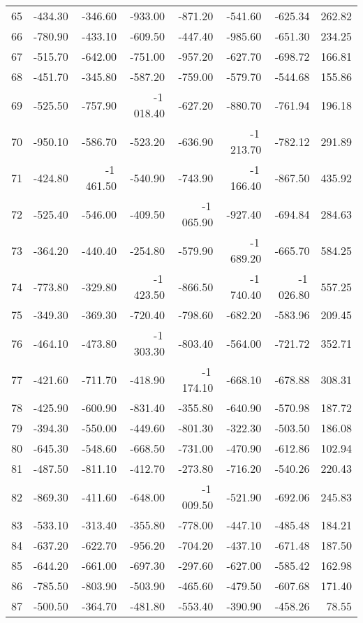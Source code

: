 \begin{longtable}{rrrrrrrr}
65 & -434.30 & -346.60 & -933.00 & -871.20 & -541.60 & -625.34 & 262.82  \\
66 & -780.90 & -433.10 & -609.50 & -447.40 & -985.60 & -651.30 & 234.25  \\
67 & -515.70 & -642.00 & -751.00 & -957.20 & -627.70 & -698.72 & 166.81  \\
68 & -451.70 & -345.80 & -587.20 & -759.00 & -579.70 & -544.68 & 155.86  \\
69 & -525.50 & -757.90 & -1\,018.40 & -627.20 & -880.70 & -761.94 & 196.18  \\
70 & -950.10 & -586.70 & -523.20 & -636.90 & -1\,213.70 & -782.12 & 291.89  \\
71 & -424.80 & -1\,461.50 & -540.90 & -743.90 & -1\,166.40 & -867.50 & 435.92  \\
72 & -525.40 & -546.00 & -409.50 & -1\,065.90 & -927.40 & -694.84 & 284.63  \\
73 & -364.20 & -440.40 & -254.80 & -579.90 & -1\,689.20 & -665.70 & 584.25  \\
74 & -773.80 & -329.80 & -1\,423.50 & -866.50 & -1\,740.40 & -1\,026.80 & 557.25  \\
75 & -349.30 & -369.30 & -720.40 & -798.60 & -682.20 & -583.96 & 209.45  \\
76 & -464.10 & -473.80 & -1\,303.30 & -803.40 & -564.00 & -721.72 & 352.71  \\
77 & -421.60 & -711.70 & -418.90 & -1\,174.10 & -668.10 & -678.88 & 308.31  \\
78 & -425.90 & -600.90 & -831.40 & -355.80 & -640.90 & -570.98 & 187.72  \\
79 & -394.30 & -550.00 & -449.60 & -801.30 & -322.30 & -503.50 & 186.08  \\
80 & -645.30 & -548.60 & -668.50 & -731.00 & -470.90 & -612.86 & 102.94  \\
81 & -487.50 & -811.10 & -412.70 & -273.80 & -716.20 & -540.26 & 220.43  \\
82 & -869.30 & -411.60 & -648.00 & -1\,009.50 & -521.90 & -692.06 & 245.83  \\
83 & -533.10 & -313.40 & -355.80 & -778.00 & -447.10 & -485.48 & 184.21  \\
84 & -637.20 & -622.70 & -956.20 & -704.20 & -437.10 & -671.48 & 187.50  \\
85 & -644.20 & -661.00 & -697.30 & -297.60 & -627.00 & -585.42 & 162.98  \\
86 & -785.50 & -803.90 & -503.90 & -465.60 & -479.50 & -607.68 & 171.40  \\
87 & -500.50 & -364.70 & -481.80 & -553.40 & -390.90 & -458.26 & 78.55  \\

\end{longtable}
